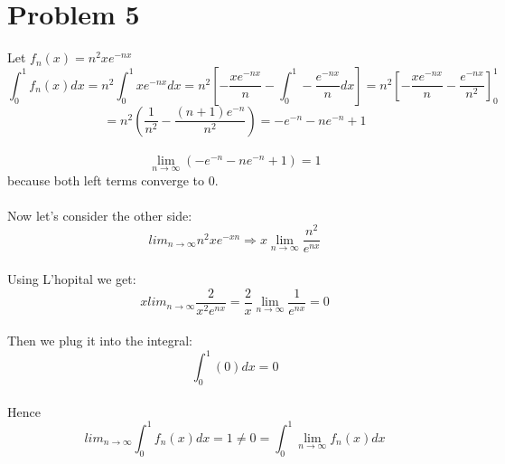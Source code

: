 \documentclass{article}
\begin{document}
\section*{Problem 5}
Let $f_n(x) = n^2xe^{-nx}$
$$\int_{0}^{1} f_n(x)dx = n^2\int_{0}^{1}xe^{-nx}dx = n^2[-\frac{xe^{-nx}}{n} - \int_{0}^{1} -\frac{e^{-nx}}{n}dx] = n^2[-\frac{xe^{-nx}}{n} - \frac{e^{-nx}}{n^2}]_0^1$$ $$= n^2(\frac{1}{n^2}-\frac{(n+1)e^{-n}}{n^2}) = -e^{-n}-ne^{-n}+1$$
\\$$\lim_{n \to \infty} (-e^{-n} - ne^{-n} + 1) = 1$$ because both left terms converge to 0.
\\
\\Now let's consider the other side: $$lim_{n \to \infty} n^2xe^{-xn} \Rightarrow x\lim_{n \to \infty} \frac{n^2}{e^{nx}}$$
\\Using L'hopital we get: $$xlim_{n \to \infty} \frac{2}{x^2e^{nx}} = \frac{2}{x}\lim_{n \to \infty} \frac{1}{e^{nx}} = 0$$
\\Then we plug it into the integral: $$\int_0^1 (0)dx = 0$$
\\Hence $$lim_{n \to \infty} \int_0^1 f_n(x)dx = 1 \neq 0 = \int_0^1 \lim_{n \to \infty} f_n(x)dx$$
\end{document}
